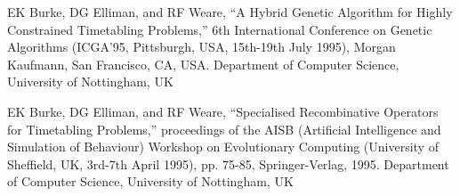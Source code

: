 \begin{thebibliography}{99}
EK Burke, DG Elliman, and RF Weare, “A Hybrid Genetic Algorithm for Highly Constrained Timetabling Problems,” 6th International Conference on Genetic Algorithms
(ICGA’95, Pittsburgh, USA, 15th-19th July 1995), Morgan Kaufmann, San Francisco,
CA, USA. Department of Computer Science, University of Nottingham, UK

EK Burke, DG Elliman, and RF Weare, “Specialised Recombinative Operators for Timetabling Problems,” proceedings of the AISB (Artificial Intelligence and Simulation
of Behaviour) Workshop on Evolutionary Computing (University of Sheffield, UK, 3rd-7th
April 1995), pp. 75-85, Springer-Verlag, 1995. Department of Computer Science,
University of Nottingham, UK

\end{thebibliography}